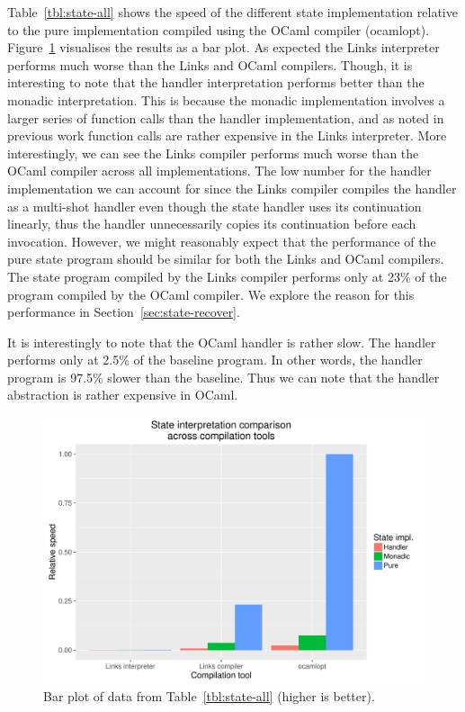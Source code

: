 \documentclass[12pt,mscres,cdtppar,twoside,openright,logo,rightchapter,normalheadings]{infthesis}
\theoremstyle{definition}
\begin{document}
Table~\ref{tbl:state-all} shows the speed of the different state
implementation relative to the pure implementation compiled using the
OCaml compiler (ocamlopt). Figure~\ref{fig:state-all} visualises the
results as a bar plot. As expected the Links interpreter performs much
worse than the Links and OCaml compilers. Though, it is interesting to
note that the handler interpretation performs better than the monadic
interpretation. This is because the monadic implementation involves a
larger series of function calls than the handler implementation, and
as noted in previous work \citep{Hillerstrom2015} function calls are
rather expensive in the Links interpreter. More interestingly, we can
see the Links compiler performs much worse than the OCaml compiler
across all implementations. The low number for the handler
implementation we can account for since the Links compiler compiles
the handler as a multi-shot handler even though the state handler uses
its continuation linearly, thus the handler unnecessarily copies its
continuation before each invocation. However, we might reasonably
expect that the performance of the pure state program should be
similar for both the Links and OCaml compilers. The state program
compiled by the Links compiler performs only at 23\% of the program
compiled by the OCaml compiler. We explore the reason for this
performance in Section~\ref{sec:state-recover}.

It is interestingly to note that the OCaml handler is rather slow. The
handler performs only at 2.5\% of the baseline program. In other
words, the handler program is 97.5\% slower than the baseline. Thus we
can note that the handler abstraction is rather expensive in OCaml.

\begin{figure}
\centering
\includegraphics[scale=0.6]{plots/stateAll.pdf}
\caption{Bar plot of data from Table~\ref{tbl:state-all} (higher is
  better).}\label{fig:state-all}
\end{figure}
\end{document}
